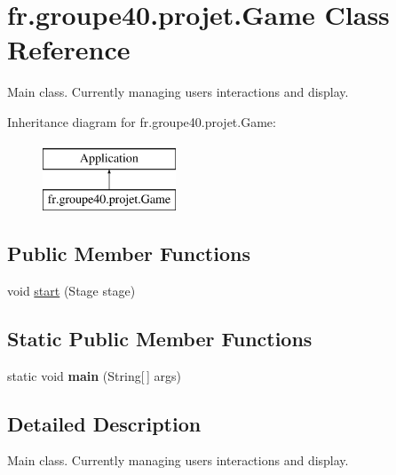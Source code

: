 \hypertarget{classfr_1_1groupe40_1_1projet_1_1_game}{}\section{fr.\+groupe40.\+projet.\+Game Class Reference}
\label{classfr_1_1groupe40_1_1projet_1_1_game}


Main class. Currently managing users interactions and display.  


Inheritance diagram for fr.\+groupe40.\+projet.\+Game\+:\begin{figure}[H]
\begin{center}
\leavevmode
\includegraphics[height=2.000000cm]{classfr_1_1groupe40_1_1projet_1_1_game}
\end{center}
\end{figure}
\subsection*{Public Member Functions}
\begin{DoxyCompactItemize}
\item 
void \hyperlink{classfr_1_1groupe40_1_1projet_1_1_game_a3700e488ecfb4fe5ff34bda5cb82b414}{start} (Stage stage)
\end{DoxyCompactItemize}
\subsection*{Static Public Member Functions}
\begin{DoxyCompactItemize}
\item 
\mbox{\label{classfr_1_1groupe40_1_1projet_1_1_game_a690e2c3a3122844e099ac0dd3c2f60d7}} 
static void {\bfseries main} (String\mbox{[}$\,$\mbox{]} args)
\end{DoxyCompactItemize}


\subsection{Detailed Description}
Main class. Currently managing users interactions and display. 

